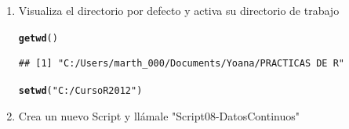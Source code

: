 \documentclass[12pt,letterpaper]{article}\usepackage[]{graphicx}\usepackage[]{color}
\makeatletter
\newcommand{\hlstr}[1]{\textcolor[rgb]{0.192,0.494,0.8}{#1}}%
\newcommand{\hlstd}[1]{\textcolor[rgb]{0.345,0.345,0.345}{#1}}%
\newcommand{\hlkwd}[1]{\textcolor[rgb]{0.737,0.353,0.396}{\textbf{#1}}}%
\newenvironment{kframe}{%
 \def\at@end@of@kframe{}%
 \ifinner\ifhmode%
  \def\at@end@of@kframe{\end{minipage}}%
  \begin{minipage}{\columnwidth}%
 \fi\fi%
 \def\FrameCommand##1{\hskip\@totalleftmargin \hskip-\fboxsep
 \colorbox{shadecolor}{##1}\hskip-\fboxsep
     \hskip-\linewidth \hskip-\@totalleftmargin \hskip\columnwidth}%
 \MakeFramed {\advance\hsize-\width
   \@totalleftmargin\z@ \linewidth\hsize
   \@setminipage}}%
 {\par\unskip\endMakeFramed%
 \at@end@of@kframe}
\newenvironment{knitrout}{}{} %
\makeatother
\begin{document}
\begin{enumerate}
  
\item Visualiza el directorio por defecto y activa su directorio de trabajo
\begin{knitrout}
\color{fgcolor}\begin{kframe}
\begin{alltt}
\hlkwd{getwd}\hlstd{()}
\end{alltt}
\begin{verbatim}
## [1] "C:/Users/marth_000/Documents/Yoana/PRACTICAS DE R"
\end{verbatim}
\begin{alltt}
\hlkwd{setwd}\hlstd{(}\hlstr{"C:/Curso R2012"}\hlstd{)}
\end{alltt}
\end{kframe}
\end{knitrout}

\item Crea un nuevo Script y ll\'amale "Script08-DatosContinuos" 


\end{enumerate}
\end{document}
